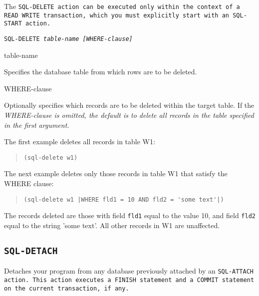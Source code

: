 {{The \tt{SQL-DELETE} action can be executed only within the context
of a \tt{READ WRITE} transaction, which you must explicitly start
with an \tt{SQL-START} action.

\Format

\tt{SQL-DELETE} \it{table-name} [\it{WHERE-clause}]

\begin{arguments}

\item[table-name]

  Specifies the database table from which rows are to be deleted.

\item[WHERE-clause]

  Optionally specifies which records are to be deleted within the
  target table. If the \it{WHERE-clause} is omitted, the default is to
  delete all records in the table specified in the first argument.
\end{arguments}

\Example

The first example deletes all records in table W1:

\begin{quote}
\begin{verbatim}
(sql-delete w1)
\end{verbatim}
\end{quote}

The next example deletes only those records in table W1 that
satisfy the WHERE clause:

\begin{quote}
\begin{verbatim}
(sql-delete w1 |WHERE fld1 = 10 AND fld2 = 'some text'|)
\end{verbatim}
\end{quote}

The records deleted are those with field \verb|fld1| equal to the
value 10, and field \verb|fld2| equal to the string 'some text'. All
other records in W1 are unaffected.

\subsection{\tt{SQL-DETACH}}

Detaches your program from any database previously attached by an
\tt{SQL-ATTACH} action. This action executes a \tt{FINISH} statement and a
COMMIT statement on the current transaction, if any.

\Format

}}
